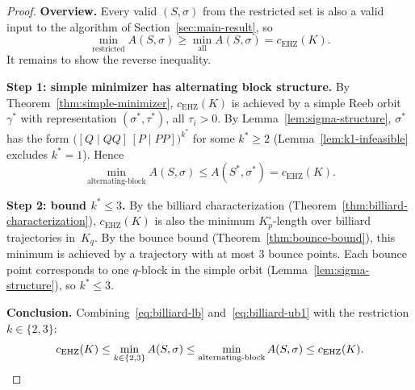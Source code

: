 \begin{proof}
\textbf{Overview.}\quad
Every valid $(S, \sigma)$ from the restricted set is also a valid
input to the algorithm of Section~\ref{sec:main-result}, so
\begin{equation}\label{eq:billiard-lb}
  \min_{\text{restricted}} A(S, \sigma)
  \geq \min_{\text{all}} A(S, \sigma)
  = c_{\mathrm{EHZ}}(K).
\end{equation}
It remains to show the reverse inequality.

\medskip\noindent
\textbf{Step 1: simple minimizer has alternating block structure.}\quad
By Theorem~\ref{thm:simple-minimizer}, $c_{\mathrm{EHZ}}(K)$ is
achieved by a simple Reeb orbit $\gamma^*$ with representation
$(\sigma^*, \tau^*)$, all $\tau_i > 0$.
By Lemma~\ref{lem:sigma-structure}, $\sigma^*$ has the form
$\bigl([Q \mid QQ]\,[P \mid PP]\bigr)^{k^*}$ for some $k^* \geq 2$
(Lemma~\ref{lem:k1-infeasible} excludes $k^* = 1$).
Hence
\begin{equation}\label{eq:billiard-ub1}
  \min_{\text{alternating-block}} A(S, \sigma) \leq A(S^*, \sigma^*)
  = c_{\mathrm{EHZ}}(K).
\end{equation}

\medskip\noindent
\textbf{Step 2: bound $k^* \leq 3$.}\quad
By the billiard characterization
(Theorem~\ref{thm:billiard-characterization}), $c_{\mathrm{EHZ}}(K)$
is also the minimum $K_p^\circ$-length over billiard trajectories
in~$K_q$. By the bounce bound (Theorem~\ref{thm:bounce-bound}),
this minimum is achieved by a trajectory with at most $3$ bounce points.
Each bounce point corresponds to one $q$-block in the simple orbit
(Lemma~\ref{lem:sigma-structure}), so $k^* \leq 3$.

\medskip\noindent
\textbf{Conclusion.}\quad
Combining~\eqref{eq:billiard-lb} and~\eqref{eq:billiard-ub1}
with the restriction $k \in \{2, 3\}$:
\[
  c_{\mathrm{EHZ}}(K)
  \leq \min_{k \in \{2,3\}} A(S, \sigma)
  \leq \min_{\text{alternating-block}} A(S, \sigma)
  \leq c_{\mathrm{EHZ}}(K). \qedhere
\]
\end{proof}

